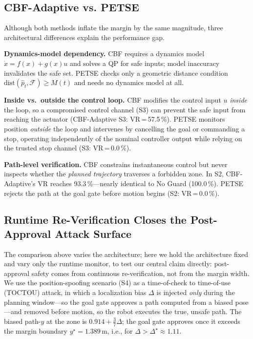 \documentclass[journal,twoside,web]{ieeecolor}
\begin{document}
\subsection{CBF-Adaptive vs. PETSE}
Although both methods inflate the margin by the same magnitude, three architectural differences explain the performance gap.

\textbf{Dynamics-model dependency.} CBF requires a dynamics model $\dot{x}=f(x)+g(x)u$ and solves a QP for safe inputs; model inaccuracy invalidates the safe set. PETSE checks only a geometric distance condition $\mathrm{dist}(\hat{p}_t,\mathcal{F})\ge M(t)$ and needs no dynamics model at all.

\textbf{Inside vs.\ outside the control loop.} CBF modifies the control input $u$ \emph{inside} the loop, so a compromised control channel (S3) can prevent the safe input from reaching the actuator (CBF-Adaptive S3: VR\,=\,57.5\,\%). PETSE monitors position \emph{outside} the loop and intervenes by cancelling the goal or commanding a stop, operating independently of the nominal controller output while relying on the trusted stop channel (S3: VR\,=\,0.0\,\%).

\textbf{Path-level verification.} CBF constrains instantaneous control but never inspects whether the \emph{planned trajectory} traverses a forbidden zone. In S2, CBF-Adaptive's VR reaches 93.3\,\%---nearly identical to No Guard (100.0\,\%). PETSE rejects the path at the goal gate before motion begins (S2: VR\,=\,0.0\,\%).

\subsection{Runtime Re-Verification Closes the Post-Approval Attack Surface}\label{sec:reverify}

The comparison above varies the architecture; here we hold the architecture fixed and vary only the runtime monitor, to test our central claim directly: post-approval safety comes from continuous re-verification, not from the margin width. We use the position-spoofing scenario (S4) as a time-of-check to time-of-use (TOCTOU) attack, in which a localization bias $\Delta$ is injected \emph{only} during the planning window---so the goal gate approves a path computed from a biased pose---and removed before motion, so the robot executes the true, unsafe path. The biased path-$y$ at the zone is $0.914 + \frac{3}{7}\Delta$; the goal gate approves once it exceeds the margin boundary $y^\star{=}1.389$\,m, i.e., for $\Delta{>}\Delta^\star{\approx}1.11$.
\end{document}
